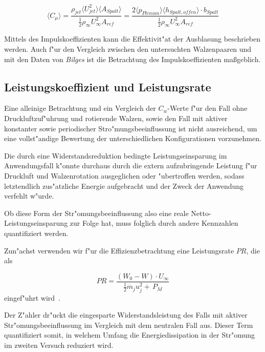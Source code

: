 	\begin{equation}
	\label{eq:momentum-coeff-oscill-final}
		\langle{C_{\mu}}\rangle = \frac{\rho_{jet}\langle{U^2_{jet}}\rangle \langle{A_{Spalt}}\rangle} {\frac{1}{2}\rho_{\infty}U^2_{\infty}A_{ref}} = \frac{2\langle{p_{Plenum}}\rangle \langle{h_{Spalt,offen}}\rangle \cdot b_{Spalt}} {\frac{1}{2}\rho_{\infty}U^2_{\infty}A_{ref}}
	\end{equation}

Mittels des Impulskoeffizienten kann die Effektivit"at der Ausblasung beschrieben werden.
Auch f"ur den Vergleich zwischen den untersuchten Walzenpaaren und mit den Daten von \textit{Bilges} \cite{Bilges.2018} ist die Betrachtung des Impulskoeffizienten ma\ss{}geblich.

\subsection{Leistungskoeffizient und Leistungsrate}
Eine alleinige Betrachtung und ein Vergleich der $C_w$-Werte f"ur den Fall ohne Druckluftzuf"uhrung und rotierende Walzen, sowie den Fall mit aktiver konstanter sowie periodischer Stro"mungsbeeinflussung ist nicht ausreichend, um eine vollst"andige Bewertung der unterschiedlichen Konfigurationen vorzunehmen.

Die durch eine Widerstandsreduktion bedingte Leistungseinsparung im Anwendungsfall k"onnte durchaus durch die extern aufzubringende Leistung f"ur Druckluft und Walzenrotation ausgeglichen oder "ubertroffen werden, sodass letztendlich zus"atzliche Energie aufgebracht und der Zweck der Anwendung verfehlt w"urde.

Ob diese Form der Str"omungsbeeinflussung also eine reale Netto-Leistungseinsparung zur Folge hat, muss folglich durch andere Kennzahlen quantifiziert werden.

Zun"achst verwenden wir f"ur die Effizienzbetrachtung eine Leistungsrate $PR$, die als 

\begin{equation}
	\label{eq:leistungsrate}
	PR = \frac{(W_0 - W)\cdot U_{\infty}}{\frac{1}{2} \dot{m_j} u_j^2 + \, P_M}
\end{equation}
eingef"uhrt wird~\cite{Freund.1994}.

Der Z"ahler dr"uckt die eingesparte Widerstandsleistung des Falls mit aktiver Str"omungsbeeinflussung im Vergleich mit dem neutralen Fall aus.
Dieser Term quantifiziert somit, in welchem Umfang die Energiedissipation in der Str"omung im zweiten Versuch reduziert wird.

